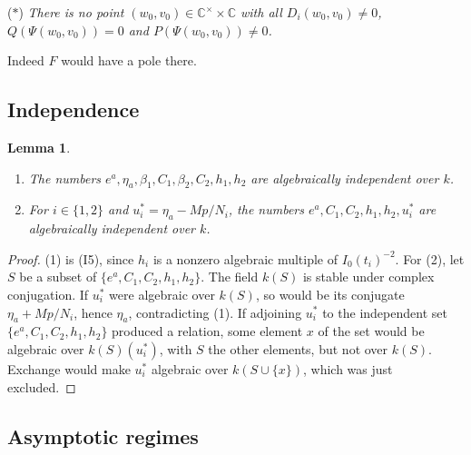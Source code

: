 \documentclass[11pt,a4paper]{article}
\newtheorem{lemma}[theorem]{Lemma}
\theoremstyle{definition}\newtheorem{definition}[theorem]{Definition}
\theoremstyle{remark}\newtheorem{remark}[theorem]{Remark}
\newcommand{\C}{\mathbb C}\newcommand{\Z}{\mathbb Z}
\begin{document}
\smallskip\noindent
($\ast$) \emph{There is no point $(w_0,v_0)\in\C^\times\times\C$ with all
$D_i(w_0,v_0)\ne0$, $Q(\Psi(w_0,v_0))=0$ and $P(\Psi(w_0,v_0))\ne0$.}

\smallskip
Indeed $F$ would have a pole there.

\subsection{Independence}

\begin{lemma}\label{wlbase:tb:indep}
\begin{enumerate}
\item The numbers $e^a,\eta_a,\beta_1,C_1,\beta_2,C_2,h_1,h_2$ are algebraically
independent over $k$.
\item For $i\in\{1,2\}$ and $u_i^*=\eta_a-Mp/N_i$, the numbers
$e^a,C_1,C_2,h_1,h_2,u_i^*$ are algebraically independent over $k$.
\end{enumerate}
\end{lemma}

\begin{proof}
(1) is (I5), since $h_i$ is a nonzero algebraic multiple of $I_0(t_i)^{-2}$.
For (2), let $S$ be a subset of $\{e^a,C_1,C_2,h_1,h_2\}$. The field $k(S)$ is
stable under complex conjugation. If $u_i^*$ were algebraic over $k(S)$, so
would be its conjugate $\eta_a+Mp/N_i$, hence $\eta_a$, contradicting (1).
If adjoining $u_i^*$ to the independent set $\{e^a,C_1,C_2,h_1,h_2\}$ produced a
relation, some element $x$ of the set would be algebraic over $k(S)(u_i^*)$,
with $S$ the other elements, but not over $k(S)$. Exchange would make $u_i^*$
algebraic over $k(S\cup\{x\})$, which was just excluded.
\end{proof}

\subsection{Asymptotic regimes}
\end{document}
